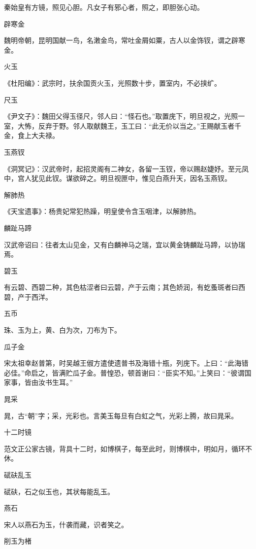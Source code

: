\documentclass[a4paper,12pt,UTF8,twoside]{ctexbook}
\begin{document}
    秦始皇有方镜，照见心胆。凡女子有邪心者，照之，即胆张心动。
    
    辟寒金
    
    魏明帝朝，昆明国献一鸟，名潄金鸟，常吐金屑如粟，古人以金饰钗，谓之辟寒金。
    
    火玉
    
    《杜阳编》：武宗时，扶余国贡火玉，光照数十步，置室内，不必挟纩。
    
    尺玉
    
    《尹文子》：魏田父得玉径尺，邻人曰：“怪石也。”取置庑下，明旦视之，光照一室，大怖，反弃于野。邻人取献魏王，玉工曰：“此无价以当之。”王赐献玉者千金，食上大夫禄。
    
    玉燕钗
    
    《洞冥记》：汉武帝时，起招灵阁有二神女，各留一玉钗，帝以赐赵婕妤。至元凤中，宫人犹见此钗。谋欲碎之。明旦视匣中，惟见白燕升天，因名玉燕钗。
    
    解肺热
    
    《天宝遗事》：杨贵妃常犯热躁，明皇使令含玉咽津，以解肺热。
    
    麟趾马蹄
    
    汉武帝诏曰：往者太山见金，又有白麟神马之瑞，宜以黄金铸麟趾马蹄，以协瑞焉。
    
    碧玉
    
    有云碧、西碧二种，其色枯涩者曰云碧，产于云南；其色娇润，有虼蚤斑者曰西碧，产于西洋。
    
    五币
    
    珠、玉为上，黄、白为次，刀布为下。
    
    瓜子金
    
    宋太祖幸赵普第，时吴越王俶方遣使遗普书及海错十瓶，列庑下。上曰：“此海错必佳。”命启之，皆满贮瓜子金。普惶恐，顿首谢曰：“臣实不知。”上笑曰：“彼谓国家事，皆由汝书生耳。”
    
    晁采
    
    晁，古“朝”字；采，光彩也。言美玉每旦有白虹之气，光彩上腾，故曰晁采。
    
    十二时镜
    
    范文正公家古镜，背具十二时，如博棋子，每至此时，则博棋中，明如月，循环不休。
    
    碔砆乱玉
    
    碔砆，石之似玉也，其状每能乱玉。
    
    燕石
    
    宋人以燕石为玉，什袭而藏，识者笑之。
    
    削玉为楮
    
\end{document}
